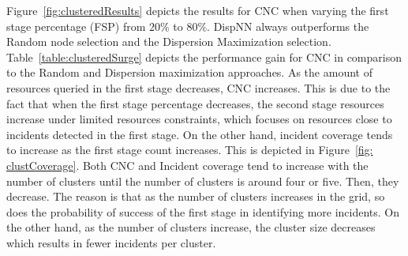 \documentclass{acm_proc_article-sp}
\begin{document}
Figure~\ref{fig:clusteredResults} depicts the results for CNC when varying the first stage percentage (FSP) from $20\%$ to $80\%$. DispNN always outperforms the Random node selection and the Dispersion Maximization selection. Table~\ref{table:clusteredSurge} depicts the performance gain for CNC in comparison to the Random and Dispersion maximization approaches. As the amount of resources queried in the first stage decreases, CNC increases. This is due to the fact that when the first stage percentage decreases, the second stage resources increase under limited resources constraints, which focuses on resources close to incidents detected in the first stage. On the other hand, incident coverage tends to increase as the first stage count increases. This is depicted in Figure~\ref{fig: clustCoverage}. Both CNC and Incident coverage tend to increase with the number of clusters until the number of clusters is around four or five. Then, they decrease. The reason is that as the number of clusters increases in the grid, so does the probability of success of the first stage in identifying more incidents. On the other hand, as the number of clusters increase, the cluster size decreases which results in fewer incidents per cluster.

\end{document}
